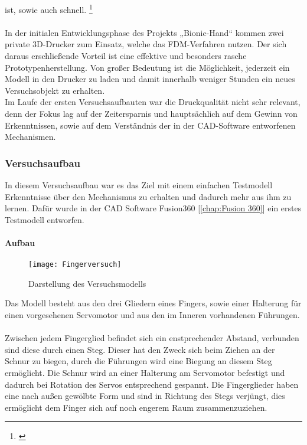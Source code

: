 \documentclass[titlepage,12pt,twoside]{article}
\begin{document}
ist, sowie auch schnell. \footnote{\cite{filamentworld}}\\
\\
\hfill \break
In der initialen Entwicklungsphase des Projekts „Bionic-Hand“ kommen zwei private 3D-Drucker zum Einsatz, welche das FDM-Verfahren nutzen. Der sich daraus erschließende 
Vorteil ist eine effektive und besonders rasche Prototypenherstellung. Von großer 
Bedeutung ist die Möglichkeit, jederzeit ein Modell in den Drucker zu laden und damit 
innerhalb weniger Stunden ein neues Versuchsobjekt zu erhalten. \\
Im Laufe der ersten Versuchsaufbauten war die Druckqualität nicht sehr relevant, denn 
der Fokus lag auf der Zeitersparnis und hauptsächlich auf dem Gewinn von Erkenntnissen, 
sowie auf dem Verständnis der in der CAD-Software entworfenen Mechanismen. \\

\subsubsection{Versuchsaufbau}
\label{chap:Versuchsaufbauten}
In diesem Versuchsaufbau war es das Ziel mit einem einfachen Testmodell Erkenntnisse über 
den Mechanismus zu erhalten und dadurch mehr aus ihm zu lernen. 
Dafür wurde in der CAD Software Fusion360 [\textcolor{blue}{\autoref{chap:Fusion 360}}] ein erstes Testmodell entworfen. \\

\paragraph{Aufbau}
\hfill \break
\hfill \break
\begin{figure}[H]
	\begin{center}
		\scalebox{0.8}
		{\texttt{[image: Fingerversuch]}}
		\caption{Darstellung des Versuchsmodells}
		\label{fig:Fingerversuch}		
	\end{center}
\end{figure}
\hfill \break
Das Modell besteht aus den drei Gliedern eines Fingers, sowie einer Halterung für einen vorgesehenen
Servomotor und aus den im Inneren vorhandenen Führungen. \\
\\
Zwischen jedem Fingerglied befindet sich ein enstprechender Abstand, verbunden sind diese durch einen Steg. Dieser hat den Zweck sich beim Ziehen an der Schnur zu biegen, durch 
die Führungen wird eine Biegung an diesem Steg ermöglicht. Die Schnur wird an einer Halterung am Servomotor befestigt und dadurch bei Rotation des Servos 
entsprechend gespannt. Die Fingerglieder haben eine nach außen gewölbte Form und sind 
in Richtung des Stegs verjüngt, dies ermöglicht dem Finger sich auf noch engerem Raum 
zusammenzuziehen.
\end{document}

